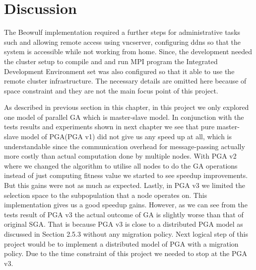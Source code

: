 \section{Discussion}
The Beowulf implementation required a further steps for administrative tasks such and allowing remote access using vncserver, configuring ddns so that the system is accessible while not working from home. Since, the development needed the cluster setup to compile and and run MPI program the Integrated Development Environment set was also configured so that it able to use the remote cluster infrastructure. The necessary details are omitted here because of space constraint and they are not the main focus point of this project.

As described in previous section in this chapter, in this project we only explored one model of parallel GA which is master-slave model. In conjunction with the tests results and experiments shown in next chapter we see that pure master-slave model of PGA(PGA v1) did not give us any speed up at all, which is understandable since the communication overhead for message-passing actually more costly than actual computation done by multiple nodes. With PGA v2 where we changed the algorithm to utilise all nodes to do the GA operations instead of just computing fitness value we started to see speedup improvements. But this gains were not as much as expected. Lastly, in PGA v3 we limited the selection space to the subpopulation that a node operates on. This implementation gives us a good speedup gains. However, as we can see from the tests result of PGA v3 the actual outcome of GA is slightly worse than that of original SGA. That is because PGA v3 is close to a distributed PGA model as discussed in Section 2.5.3 without any migration policy. Next logical step of this project would be to implement a distributed model of PGA with a migration policy. Due to the time constraint of this project we needed to stop at the PGA v3.
